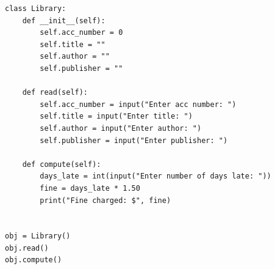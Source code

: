 \begin{verbatim}
class Library:
    def __init__(self):
        self.acc_number = 0
        self.title = ""
        self.author = ""
        self.publisher = ""

    def read(self):
        self.acc_number = input("Enter acc number: ")
        self.title = input("Enter title: ")
        self.author = input("Enter author: ")
        self.publisher = input("Enter publisher: ")

    def compute(self):
        days_late = int(input("Enter number of days late: "))
        fine = days_late * 1.50
        print("Fine charged: $", fine)


obj = Library()
obj.read()
obj.compute()
\end{verbatim}